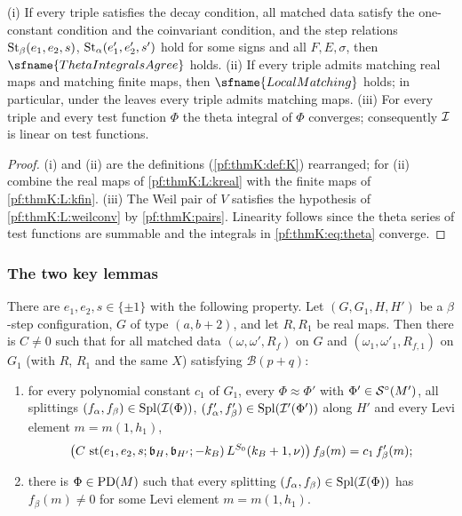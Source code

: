 \begin{lemma}\label{pf:thmK:parts}
(i) If every triple satisfies the decay condition, all matched data satisfy the one-constant condition and the
coinvariant condition, and the step relations $\operatorname{St}_\beta(e_1,e_2,s)$, $\operatorname{St}_\alpha(e'_1,e'_2,s')$ hold for some signs
and all $F,E,\sigma$, then $\sfname{ThetaIntegralsAgree}$ holds. (ii) If every triple admits matching real maps and
matching finite maps, then $\sfname{LocalMatching}$ holds; in particular, under the leaves every triple admits matching
maps. (iii) For every triple and every test function $\Phi$ the theta integral of $\Phi$ converges; consequently $\mathcal{I}$
is linear on test functions.
\end{lemma}

\begin{proof}
(i) and (ii) are the definitions (\cref{pf:thmK:def:K}) rearranged; for (ii) combine the real maps of
\ref{pf:thmK:L:kreal} with the finite maps of \ref{pf:thmK:L:kfin}. (iii) The Weil pair of $V$ satisfies the hypothesis of
\ref{pf:thmK:L:weilconv} by \cref{pf:thmK:pairs}. Linearity follows since the theta series of test functions are summable
and the integrals in \eqref{pf:thmK:eq:theta} converge.
\end{proof}

\subsubsection{The two key lemmas}

\begin{lemma}\label{pf:thmK:keyB}
There are $e_1,e_2,s\in\{\pm1\}$ with the following property. Let $(G,G_1,H,H')$ be a $\beta$-step configuration, $G$ of
type $(a,b+2)$, and let $R,R_1$ be real maps. Then there is $C\ne0$ such that for all matched data $(\omega,\omega',R_f)$ on
$G$ and $(\omega_1,\omega'_1,R_{f,1})$ on $G_1$ (with $R$, $R_1$ and the same $X$) satisfying $\mathcal B(p+q)$:
\begin{enumerate}
\item for every polynomial constant $c_1$ of $G_1$, every $\Phi\approx\Phi'$ with $\Phi'\in\mathcal{S}^{\circ}(M')$, all splittings
$(f_\alpha,f_\beta)\in\operatorname{Spl}(\mathcal{I}(\Phi))$, $(f'_\alpha,f'_\beta)\in\operatorname{Spl}(\mathcal{I}'(\Phi'))$ along $H'$ and every Levi
element $m=m(1,h_1)$,
\begin{equation}\label{pf:thmK:eq:keyB}
\bigl(C\,\operatorname{st}(e_1,e_2,s;\mathfrak b_H,\mathfrak b_{H'};-k_B)\,L^{S_0}(k_B+1,\nu)\bigr)\,f_\beta(m)=c_1\,f'_\beta(m);
\end{equation}
\item there is $\Phi\in\operatorname{PD}(M)$ such that every splitting $(f_\alpha,f_\beta)\in\operatorname{Spl}(\mathcal{I}(\Phi))$ has
$f_\beta(m)\ne0$ for some Levi element $m=m(1,h_1)$.
\end{enumerate}
\end{lemma}

